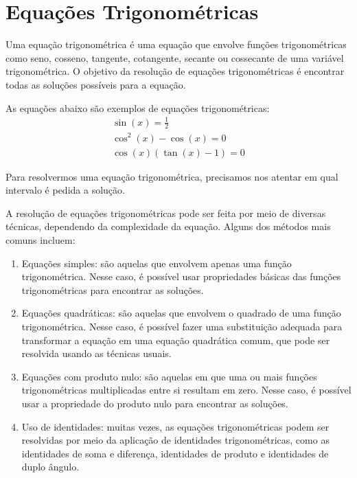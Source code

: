 \section{Equações Trigonométricas}

Uma equação trigonométrica é uma equação que envolve funções trigonométricas
como seno, cosseno, tangente, cotangente, secante ou cossecante de uma variável
trigonométrica. O objetivo da resolução de equações trigonométricas é encontrar
todas as soluções possíveis para a equação.

As equações abaixo são exemplos de equações trigonométricas:
\begin{gather*}
  \sin(x) = \frac{1}{2} \\[2mm]
  \cos^2(x)-\cos(x) = 0 \\[3mm]
  \cos(x)\left(\tan(x)-1\right) = 0
\end{gather*}

Para resolvermos uma equação trigonométrica, precisamos nos atentar em qual
intervalo é pedida a solução.

A resolução de equações trigonométricas pode ser feita por meio de diversas
técnicas, dependendo da complexidade da equação. Alguns dos métodos mais comuns
incluem:
\begin{enumerate}
  \item Equações simples: são aquelas que envolvem apenas uma função
    trigonométrica. Nesse caso, é possível usar propriedades básicas das
    funções trigonométricas para encontrar as soluções.

  \item Equações quadráticas: são aquelas que envolvem o quadrado de uma função
    trigonométrica. Nesse caso, é possível fazer uma substituição adequada para
    transformar a equação em uma equação quadrática comum, que pode ser
    resolvida usando as técnicas usuais.

  \item Equações com produto nulo: são aquelas em que uma ou mais funções
    trigonométricas multiplicadas entre si resultam em zero. Nesse caso, é
    possível usar a propriedade do produto nulo para encontrar as soluções.

  \item Uso de identidades: muitas vezes, as equações trigonométricas podem ser
    resolvidas por meio da aplicação de identidades trigonométricas, como as
    identidades de soma e diferença, identidades de produto e identidades de
    duplo ângulo.
\end{enumerate}


